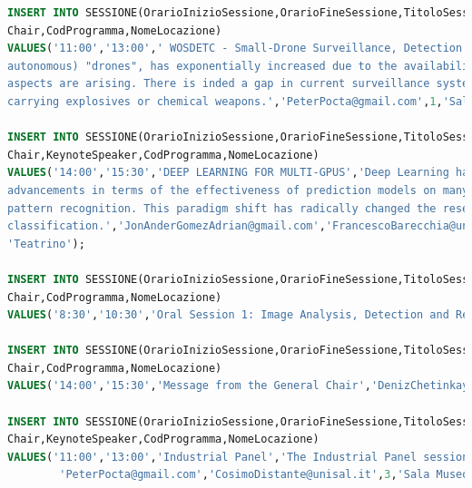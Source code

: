 \documentclass[a4page]{article}
\begin{document}
\begin{lstlisting}[language=SQL,
        deletekeywords={IDENTITY,INT},
        morekeywords={clustered},    
        framesep=10pt,
        framextopmargin=10pt]
INSERT INTO SESSIONE(OrarioInizioSessione,OrarioFineSessione,TitoloSessione,DescrizioneSessione,
Chair,CodProgramma,NomeLocazione)
VALUES('11:00','13:00',' WOSDETC - Small-Drone Surveillance, Detection and Counteraction Techniques','In the last few years the popularity of small Remotely Piloted Aircraft Systems (RPAS) and more generally (also 
autonomous) "drones", has exponentially increased due to the availability of low-cost off-the-shelf products, including build-from-scratch and DIY kits. At the same time, issues regarding safety, privacy and security 
aspects are arising. There is inded a gap in current surveillance systems for the detection of such flying systems, which can be used for illegal activities such as smuggling of drugs or espionage, as well as for
carrying explosives or chemical weapons.','PeterPocta@gmail.com',1,'Sala sul Chiostro del 500 (First floor)');

INSERT INTO SESSIONE(OrarioInizioSessione,OrarioFineSessione,TitoloSessione,DescrizioneSessione,
Chair,KeynoteSpeaker,CodProgramma,NomeLocazione)
VALUES('14:00','15:30','DEEP LEARNING FOR MULTI-GPUS','Deep Learning has been the most significant breakthrough in the past 10 years in the field of pattern recognition and machine learning. It has achieved significant
advancements in terms of the effectiveness of prediction models on many research topics and application fields, ranging from computer vision, natural language processing, embodied AI and to more traditional fields of 
pattern recognition. This paradigm shift has radically changed the research methodology towards a data-oriented approach, in which learning involves all steps of the prediction pipeline from feature extraction to
classification.','JonAnderGomezAdrian@gmail.com','FrancescoBarecchia@unina.it',1,
'Teatrino');
	   
INSERT INTO SESSIONE(OrarioInizioSessione,OrarioFineSessione,TitoloSessione,
Chair,CodProgramma,NomeLocazione)
VALUES('8:30','10:30','Oral Session 1: Image Analysis, Detection and Recognition','ZoheirSabeur@gmail.com',2,'Sala d''arte (First floor)');

INSERT INTO SESSIONE(OrarioInizioSessione,OrarioFineSessione,TitoloSessione,
Chair,CodProgramma,NomeLocazione)
VALUES('14:00','15:30','Message from the General Chair','DenizChetinkaya@gmail.com',2,'Teatrino');

INSERT INTO SESSIONE(OrarioInizioSessione,OrarioFineSessione,TitoloSessione,DescrizioneSessione,
Chair,KeynoteSpeaker,CodProgramma,NomeLocazione)
VALUES('11:00','13:00','Industrial Panel','The Industrial Panel session will start with presentations by the panelists, introducing the companies and the technological challenges of their business.',
		'PeterPocta@gmail.com','CosimoDistante@unisal.it',3,'Sala Museo della Stampa');


\end{lstlisting}
\end{document}
